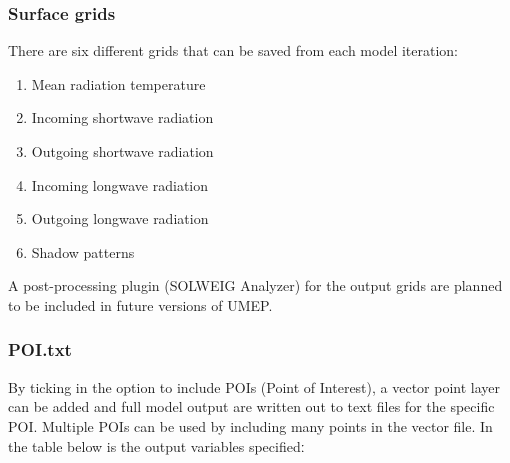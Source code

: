 \documentclass[letterpaper,10pt,english]{sphinxmanual}
\begin{document}
\subsubsection{Surface grids}
\label{\detokenize{OtherManuals/SOLWEIG:surface-grids}}
There are six different grids that can be saved from each model
iteration:
\begin{enumerate}
\item {} 
Mean radiation temperature

\item {} 
Incoming shortwave radiation

\item {} 
Outgoing shortwave radiation

\item {} 
Incoming longwave radiation

\item {} 
Outgoing longwave radiation

\item {} 
Shadow patterns

\end{enumerate}

A post-processing plugin (SOLWEIG Analyzer) for the output grids are
planned to be included in future versions of UMEP.


\subsubsection{POI.txt}
\label{\detokenize{OtherManuals/SOLWEIG:poi-txt}}
By ticking in the option to include POIs (Point of Interest), a vector
point layer can be added and full model output are written out to text
files for the specific POI. Multiple POIs can be used by including many
points in the vector file. In the table below is the output variables
specifiedː
\end{document}
